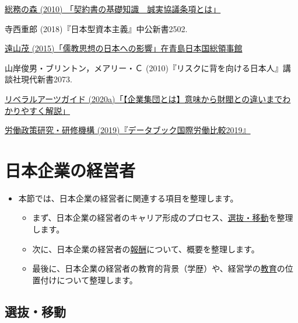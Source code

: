 \documentclass[
]{book}
\begin{document}
\href{https://www.soumunomori.com/column/article/atc-115077/}{総務の森 (2010) 「契約書の基礎知識　誠実協議条項とは」}

寺西重郎 (2018)『日本型資本主義』中公新書2502.

\href{https://www.qingdao.cn.emb-japan.go.jp/jp/publicrelations/index_150917.html}{遠山茂 (2015)「儒教思想の日本への影響」在青島日本国総領事館}

山岸俊男・ブリントン，メアリー・Ｃ (2010)『リスクに背を向ける日本人』講談社現代新書2073.

\href{https://liberal-arts-guide.com/corporate-group/}{リベラルアーツガイド (2020a)「【企業集団とは】意味から財閥との違いまでわかりやすく解説」}

\href{https://www.jil.go.jp/kokunai/statistics/databook/2019/index.html}{労働政策研究・研修機構 (2019)『データブック国際労働比較2019』}

\hypertarget{japan-manager}{%
\section{日本企業の経営者}\label{japan-manager}}

\begin{itemize}
\item
  本節では、日本企業の経営者に関連する項目を整理します。

  \begin{itemize}
  \item
    まず、日本企業の経営者のキャリア形成のプロセス、\protect\hyperlink{japan-selection}{選抜・移動}を整理します。
  \item
    次に、日本企業の経営者の\protect\hyperlink{japan-payment}{報酬}について、概要を整理します。
  \item
    最後に、日本企業の経営者の教育的背景（学歴）や、経営学の\protect\hyperlink{japan-education}{教育}の位置付けについて整理します。
  \end{itemize}
\end{itemize}

\hypertarget{japan-selection}{%
\subsection{選抜・移動}\label{japan-selection}}
\end{document}
